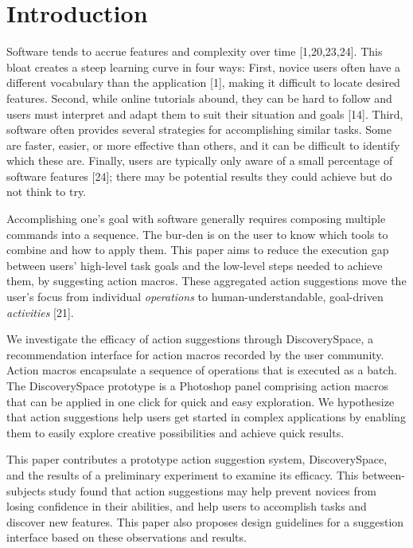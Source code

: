 \section{Introduction}
Software tends to accrue features and complexity over time [1,20,23,24]. This bloat creates a steep learning curve in four ways: First, novice users often have a different vocabulary than the application [1], making it difficult to locate desired features. Second, while online tutorials abound, they can be hard to follow and users must interpret and adapt them to suit their situation and goals [14]. Third, software often provides several strategies for accomplishing similar tasks. Some are faster, easier, or more effective than others, and it can be difficult to identify which these are. Finally, users are typically only aware of a small percentage of software features [24]; there may be potential results they could achieve but do not think to try.

Accomplishing one's goal with software generally requires composing multiple commands into a sequence. The bur-den is on the user to know which tools to combine and how to apply them. This paper aims to reduce the execution gap between users' high-level task goals and the low-level steps needed to achieve them, by suggesting action macros. These aggregated action suggestions move the user's focus from individual \textit{operations} to human-understandable, goal-driven \textit{activities} [21].

We investigate the efficacy of action suggestions through Discovery\-Space, a recommendation interface for action macros recorded by the user community. Action macros encapsulate a sequence of operations that is executed as a batch. The Discovery\-Space prototype is a Photoshop panel comprising action macros that can be applied in one click for quick and easy exploration. We hypothesize that action suggestions help users get started in complex applications by enabling them to easily explore creative possibilities and achieve quick results.

This paper contributes a prototype action suggestion system, Discovery\-Space, and the results of a preliminary experiment to examine its efficacy. This between-subjects study found that action suggestions may help prevent novices from losing confidence in their abilities, and help users to accomplish tasks and discover new features. This paper also proposes design guidelines for a suggestion interface based on these observations and results.
